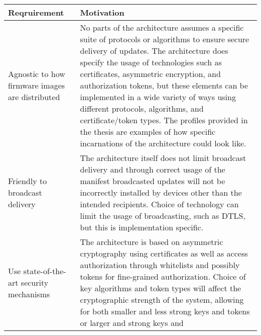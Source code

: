 \begin{longtable}[]{@{}ll@{}}
\toprule
\begin{minipage}[b]{0.41\columnwidth}\raggedright\strut
Reqruirement\strut
\end{minipage} & \begin{minipage}[b]{0.53\columnwidth}\raggedright\strut
Motivation\strut
\end{minipage}\tabularnewline
\midrule
\endhead
\begin{minipage}[t]{0.41\columnwidth}\raggedright\strut
Agnostic to how firmware images are distributed\strut
\end{minipage} & \begin{minipage}[t]{0.53\columnwidth}\raggedright\strut
No parts of the architecture assumes a specific suite of protocols or
algorithms to ensure secure delivery of updates. The architecture does
specify the usage of technologies such as certificates, asymmetric
encryption, and authorization tokens, but these elements can be
implemented in a wide variety of ways using different protocols,
algorithms, and certificate/token types. The profiles provided in the
thesis are examples of how specific incarnations of the architecture
could look like.\strut
\end{minipage}\tabularnewline
\begin{minipage}[t]{0.41\columnwidth}\raggedright\strut
Friendly to broadcast delivery\strut
\end{minipage} & \begin{minipage}[t]{0.53\columnwidth}\raggedright\strut
The architecture itself does not limit broadcast delivery and through
correct usage of the manifest broadcasted updates will not be
incorrectly installed by devices other than the intended recipients.
Choice of technology can limit the usage of broadcasting, such as DTLS,
but this is implementation specific.\strut
\end{minipage}\tabularnewline
\begin{minipage}[t]{0.41\columnwidth}\raggedright\strut
Use state-of-the-art security mechanisms\strut
\end{minipage} & \begin{minipage}[t]{0.53\columnwidth}\raggedright\strut
The architecture is based on asymmetric cryptography using certificates
as well as access authorization through whitelists and possibly tokens
for fine-grained authorization. Choice of key algorithms and token types
will affect the cryptographic strength of the system, allowing for both
smaller and less strong keys and tokens or larger and strong keys and

\end{minipage}
\end{longtable}

